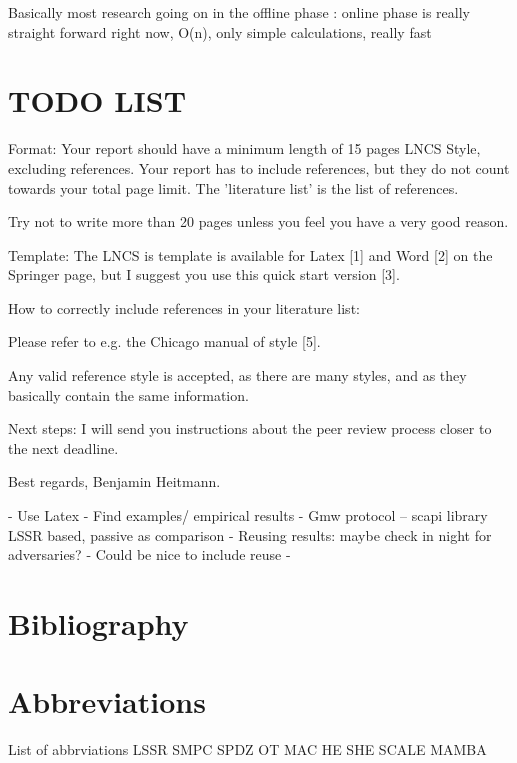 \documentclass[english,runningheads,a4paper]{llncs}[2018/03/10]
\begin{document}
Basically most research going on in the offline phase : online phase is really straight forward right now, O(n), only simple calculations, really fast


\section{TODO LIST}\label{sec:xxx}


Format: 
Your report should have a minimum length of 15 pages LNCS Style, excluding references. 
Your report has to include references, but they do not count towards your total page limit. The 'literature list' is the list of references. 

Try not to write more than 20 pages unless you feel you have a very good reason. 

Template: 
The LNCS is template is available for Latex [1] and Word [2] on the Springer page, 
but I suggest you use this quick start version [3]. 

How to correctly include references in your literature list: 

Please refer to e.g. the Chicago manual of style [5].

Any valid reference style is accepted, as there are many styles, and as they basically contain the same information. 



Next steps: 
I will send you instructions about the peer review process closer to the next deadline.



Best regards, Benjamin Heitmann.



-	Use Latex
-	Find examples/ empirical results
-	Gmw protocol – scapi library LSSR based, passive as comparison
-	Reusing results: maybe check in night for adversaries?
-	Could be nice to include reuse
-	



\section{Bibliography}\label{sec:biblio}


\section{Abbreviations}\label{sec:abb}


List of abbrviations
LSSR
SMPC
SPDZ
OT
MAC
HE
SHE
SCALE
MAMBA
\end{document}
